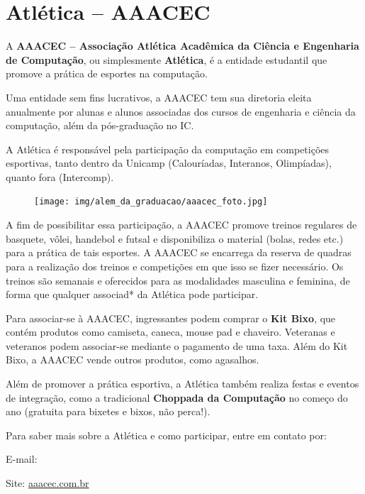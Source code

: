
\section{Atlética -- AAACEC}

A \textbf{AAACEC -- Associação Atlética Acadêmica da Ciência e Engenharia de
Computação}, ou simplesmente \textbf{Atlética}, é a entidade estudantil que
promove a prática de esportes na computação.

Uma entidade sem fins lucrativos, a AAACEC tem sua diretoria eleita anualmente
por alunas e alunos associadas dos cursos de engenharia e ciência da
computação, além da pós-graduação no IC.

A Atlética é responsável pela participação da computação em competições
esportivas, tanto dentro da Unicamp (Calouríadas, Interanos, Olimpíadas),
quanto fora (Intercomp).

\begin{figure}[H]
  \centering
  \texttt{[image: img/alem\_da\_graduacao/aaacec\_foto.jpg]}
\end{figure}

A fim de possibilitar essa participação, a AAACEC promove treinos regulares de
basquete, vôlei, handebol e futsal e disponibiliza o material (bolas, redes
etc.) para a prática de tais esportes. A AAACEC se encarrega da reserva de
quadras para a realização dos treinos e competições em que isso se fizer
necessário. Os treinos são semanais e oferecidos para as modalidades masculina
e feminina, de forma que qualquer associad* da Atlética pode participar.

Para associar-se à AAACEC, ingressantes podem comprar o \textbf{Kit Bixo},
que contém produtos co\-mo camiseta, caneca, mouse pad e chaveiro. Veteranas
e veteranos podem associar-se mediante o pagamento de uma taxa. Além do Kit
Bixo, a AAACEC vende outros produtos, como agasalhos.

Além de promover a prática esportiva, a Atlética também realiza festas e
eventos de integração, como a tradicional \textbf{Choppada da Computação} no
começo do ano (gratuita para bixetes e bixos, não perca!).

Para saber mais sobre a Atlética e como participar, entre em contato por:
\begin{compactitemize}
\item E-mail: 
\item Site: \url{aaacec.com.br}
\end{compactitemize}

